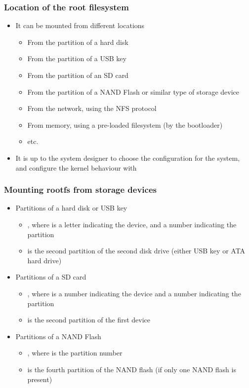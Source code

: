 \begin{frame}
  \frametitle{Location of the root filesystem}
  \begin{itemize}
  \item It can be mounted from different locations
    \begin{itemize}
    \item From the partition of a hard disk
    \item From the partition of a USB key
    \item From the partition of an SD card
    \item From the partition of a NAND Flash or similar type of
      storage device
    \item From the network, using the NFS protocol
    \item From memory, using a pre-loaded filesystem (by the
      bootloader)
    \item etc.
    \end{itemize}
  \item It is up to the system designer to choose the configuration
    for the system, and configure the kernel behaviour with
  \end{itemize}
\end{frame}

\begin{frame}
  \frametitle{Mounting rootfs from storage devices}
  \begin{itemize}
  \item Partitions of a hard disk or USB key
    \begin{itemize}
    \item {}, where  is a letter indicating
      the device, and  a number indicating the partition
    \item {} is the second partition of the second disk
      drive (either USB key or ATA hard drive)
    \end{itemize}
  \item Partitions of a SD card
    \begin{itemize}
    \item {}, where  is a number
      indicating the device and  a number indicating the
      partition
    \item {} is the second partition of the first
      device
    \end{itemize}
  \item Partitions of a NAND Flash
    \begin{itemize}
    \item {}, where  is the partition number
    \item {} is the fourth partition of the NAND
      flash (if only one NAND flash is present)
    \end{itemize}
  \end{itemize}
\end{frame}

